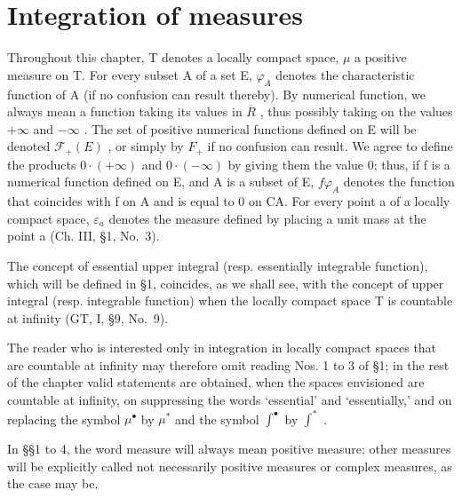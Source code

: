 \chapter{Integration of measures}

Throughout this chapter, T denotes a locally compact space, \(\mu\) a positive measure on T. For every subset A of a set E, \(\varphi_{A}\) denotes the characteristic function of A (if no confusion can result thereby). By numerical function, we always mean a function taking its values in \(\overline{R}\) , thus possibly taking on the values \(+\infty\) and \(-\infty\) . The set of positive numerical functions defined on E will be denoted \(\mathcal{F}_{+}(E)\) , or simply by \(F_{+}\) if no confusion can result. We agree to define the products \(0 \cdot (+\infty)\) and \(0 \cdot (-\infty)\) by giving them the value 0; thus, if f is a numerical function defined on E, and A is a subset of E, \(f\varphi_{A}\) denotes the function that coincides with f on A and is equal to 0 on CA. For every point a of a locally compact space, \(\varepsilon_{a}\) denotes the measure defined by placing a unit mass at the point a (Ch. III, §1, No.~3).

The concept of essential upper integral (resp. essentially integrable function), which will be defined in §1, coincides, as we shall see, with the concept of upper integral (resp. integrable function) when the locally compact space T is countable at infinity (GT, I, §9, No.~9).

The reader who is interested only in integration in locally compact spaces that are countable at infinity may therefore omit reading Nos. 1 to 3 of §1; in the rest of the chapter valid statements are obtained, when the spaces envisioned are countable at infinity, on suppressing the words `essential' and `essentially,' and on replacing the symbol \(\mu^{\bullet}\) by \(\mu^{*}\) and the symbol \(\int^{\bullet}\) by \(\int^{*}\) .

In §§1 to 4, the word measure will always mean positive measure; other measures will be explicitly called not necessarily positive measures or complex measures, as the case may be.


